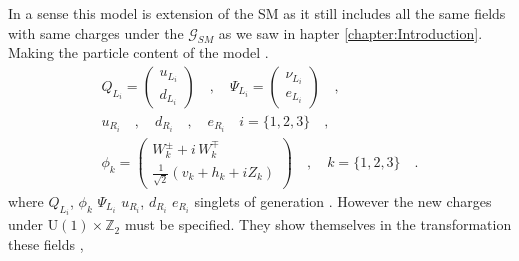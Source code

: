 In a sense\Joaoadd{,} this model is  extension of the SM as it still includes all the same fields with same charges under the $\mathcal{G}_{SM}$ as we saw in hapter \ref{chapter:Introduction}. 
% 
Making the particle content of the model . 
%
%
\begin{equation}
\label{eq:3HDM_Fields}
\begin{gathered}
Q_{L_i} =  \begin{pmatrix}
u_{L_i}  \\
d_{L_i}
\end{pmatrix} \quad , \quad \Psi_{L_i} =  \begin{pmatrix}
\nu_{L_i}  \\
e_{L_i}
\end{pmatrix} \quad , \quad \\ 
u_{R_i} \quad , \quad d_{R_i} \quad , \quad e_{R_i} \quad i=\{1,2,3\} \quad ,  \\  
\phi_k = \begin{pmatrix}
W_k^\pm + i \, W_k^\mp \\ 
\frac{1}{\sqrt{2}}\left( v_k + h_k + i Z_k \right) 
\end{pmatrix}  \quad , \quad k=\{ 1,2,3\} \quad . 
\end{gathered} 
\end{equation}
%
where $Q_{L_i}$, $\phi_k$  $\Psi_{L_i}$   $u_{R_i}$, $d_{R_i}$  $e_{R_i}$   singlets of     generation  . 
%
However the new charges under $\mathrm{U(1)}\times\mathbb{Z}_2$ must be specified. 
%
They show themselves in the transformation  these fields , 
%
